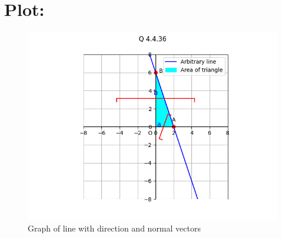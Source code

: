 \documentclass[a4paper, 12pt]{article}
\begin{document}
\section{Plot: }
\begin{figure}[h!]
    \centering
    \includegraphics[width=\columnwidth]{figs/plot.png}
    \caption{Graph of line with direction and normal vectors}
    \label{fig:4.4.36}
\end{figure}
\end{document}
